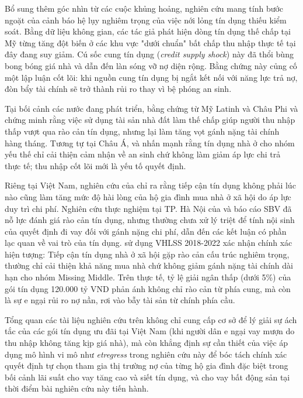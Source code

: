 \documentclass[12pt,a4paper]{report}
\begin{document}
Bổ sung thêm góc nhìn từ các cuộc khủng hoảng, nghiên cứu mang tính bước ngoặt của \textcite{MianSufi2009} cảnh báo hệ lụy nghiêm trọng của việc nới lỏng tín dụng thiếu kiểm soát. Bằng dữ liệu không gian, các tác giả phát hiện dòng tín dụng thế chấp tại Mỹ từng tăng đột biến ở các khu vực "dưới chuẩn" bất chấp thu nhập thực tế tại đây đang suy giảm. Cú sốc cung tín dụng (\textit{credit supply shock}) này đã thổi bùng bong bóng giá nhà và dẫn đến làn sóng vỡ nợ diện rộng. Bằng chứng này củng cố một lập luận cốt lõi: khi nguồn cung tín dụng bị ngắt kết nối với năng lực trả nợ, đòn bẩy tài chính sẽ trở thành rủi ro thay vì bệ phóng an sinh. 

Tại bối cảnh các nước đang phát triển, bằng chứng từ Mỹ Latinh và Châu Phi \parencite{Arrieta2005} và \parencite{Edwin2023} chứng minh rằng việc sử dụng tài sản nhà đất làm thế chấp giúp người thu nhập thấp vượt qua rào cản tín dụng, nhưng lại làm tăng vọt gánh nặng tài chính hàng tháng. Tương tự tại Châu Á, \textcite{Sato2024} và \textcite{Syed2025} nhấn mạnh rằng tín dụng nhà ở cho nhóm yếu thế chỉ cải thiện cảm nhận về an sinh chứ không làm giảm áp lực chi trả thực tế; thu nhập cốt lõi mới là yếu tố quyết định.

Riêng tại Việt Nam, nghiên cứu của \textcite{Nguyen2016} chỉ ra rằng tiếp cận tín dụng không phải lúc nào cũng làm tăng mức độ hài lòng của hộ gia đình mua nhà ở xã hội do áp lực duy trì chi phí. Nghiên cứu thực nghiệm tại TP. Hà Nội của \textcite{BuiTruong2023} và báo cáo SBV \textcite{SBV2025} đã nỗ lực đánh giá rào cản tín dụng, nhưng thường chưa xử lý triệt để tính nội sinh của quyết định đi vay đối với gánh nặng chi phí, dẫn đến các kết luận có phần lạc quan về vai trò của tín dụng. \textcite{WorldBank2024} sử dụng VHLSS 2018-2022 xác nhận chính xác hiện tượng: Tiếp cận tín dụng nhà ở xã hội gặp rào cản cấu trúc nghiêm trọng, thường chỉ cải thiện khả năng mua nhà chứ không giảm gánh nặng tài chính dài hạn cho nhóm Missing Middle. Trên thực tế, tỷ lệ giải ngân thấp (dưới 5\%) của gói tín dụng 120.000 tỷ VND phản ánh không chỉ rào cản từ phía cung, mà còn là sự e ngại rủi ro nợ nần, rơi vào bẫy tài sản từ chính phía cầu. 

Tổng quan các tài liệu nghiên cứu trên không chỉ cung cấp cơ sở để lý giải sự ách tắc của các gói tín dụng ưu đãi tại Việt Nam (khi người dân e ngại vay mượn do thu nhập không tăng kịp giá nhà), mà còn khẳng định sự cần thiết của việc áp dụng mô hình vi mô như \textit{etregress} trong nghiên cứu này để bóc tách chính xác quyết định tự chọn tham gia thị trường nợ của từng hộ gia đình đặc biệt trong bối cảnh lãi suất cho vay tăng cao và siết tín dụng, và cho vay bất động sản tại thời điểm bài nghiên cứu này tiến hành.
\end{document}
